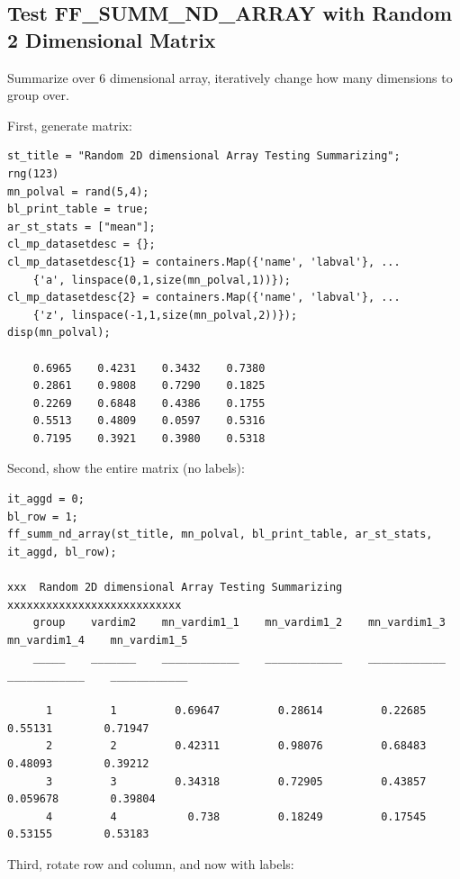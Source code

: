 \documentclass[
]{book}
\begin{document}
\hypertarget{test-ff_summ_nd_array-with-random-2-dimensional-matrix}{%
\subsection{Test FF\_SUMM\_ND\_ARRAY with Random 2 Dimensional Matrix}\label{test-ff_summ_nd_array-with-random-2-dimensional-matrix}}

Summarize over 6 dimensional array, iteratively change how many
dimensions to group over.

First, generate matrix:

\begin{verbatim}
st_title = "Random 2D dimensional Array Testing Summarizing";
rng(123)
mn_polval = rand(5,4);
bl_print_table = true;
ar_st_stats = ["mean"];
cl_mp_datasetdesc = {};
cl_mp_datasetdesc{1} = containers.Map({'name', 'labval'}, ...
    {'a', linspace(0,1,size(mn_polval,1))});
cl_mp_datasetdesc{2} = containers.Map({'name', 'labval'}, ...
    {'z', linspace(-1,1,size(mn_polval,2))});
disp(mn_polval);

    0.6965    0.4231    0.3432    0.7380
    0.2861    0.9808    0.7290    0.1825
    0.2269    0.6848    0.4386    0.1755
    0.5513    0.4809    0.0597    0.5316
    0.7195    0.3921    0.3980    0.5318
\end{verbatim}

Second, show the entire matrix (no labels):

\begin{verbatim}
it_aggd = 0; 
bl_row = 1; 
ff_summ_nd_array(st_title, mn_polval, bl_print_table, ar_st_stats, it_aggd, bl_row);

xxx  Random 2D dimensional Array Testing Summarizing  xxxxxxxxxxxxxxxxxxxxxxxxxxx
    group    vardim2    mn_vardim1_1    mn_vardim1_2    mn_vardim1_3    mn_vardim1_4    mn_vardim1_5
    _____    _______    ____________    ____________    ____________    ____________    ____________

      1         1         0.69647         0.28614         0.22685          0.55131        0.71947   
      2         2         0.42311         0.98076         0.68483          0.48093        0.39212   
      3         3         0.34318         0.72905         0.43857         0.059678        0.39804   
      4         4           0.738         0.18249         0.17545          0.53155        0.53183   
\end{verbatim}

Third, rotate row and column, and now with labels:
\end{document}
